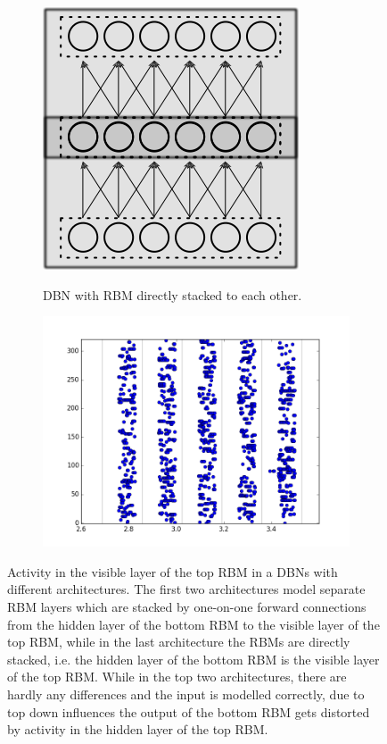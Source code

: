 \begin{figure}[h!]
	
	\begin{subfigure}[t]{.49\textwidth}
  		\centering
  		\includegraphics[width=.50\linewidth]{imgs/app/dbn_np_arch.png}
  		\label{fig:sub1}
  		 \caption{DBN with RBM directly stacked to each other.}
	\end{subfigure}%
	\begin{subfigure}[t]{.49\textwidth}
  		\centering
  		\includegraphics[width=.9\linewidth]{imgs/app/DBN_np_sp.png}
  		\label{fig:sub2}
	\end{subfigure}
	\caption[Activity in the visible layer of the top RBM in a DBNs with different architectures.]{Activity in the visible layer of the top RBM in a DBNs with different architectures. The first two architectures model separate RBM layers which are stacked by one-on-one forward connections from the hidden layer of the bottom RBM to the visible layer of the top RBM, while in the last architecture the RBMs are directly stacked, i.e. the hidden layer of the bottom RBM is the visible layer of the top RBM. While in the top two architectures, there are hardly any differences and the input is modelled correctly, due to top down influences the output of the bottom RBM gets distorted by activity in the hidden layer of the top RBM.}
	\label{fig:spikingdbnarch}
\end{figure}

